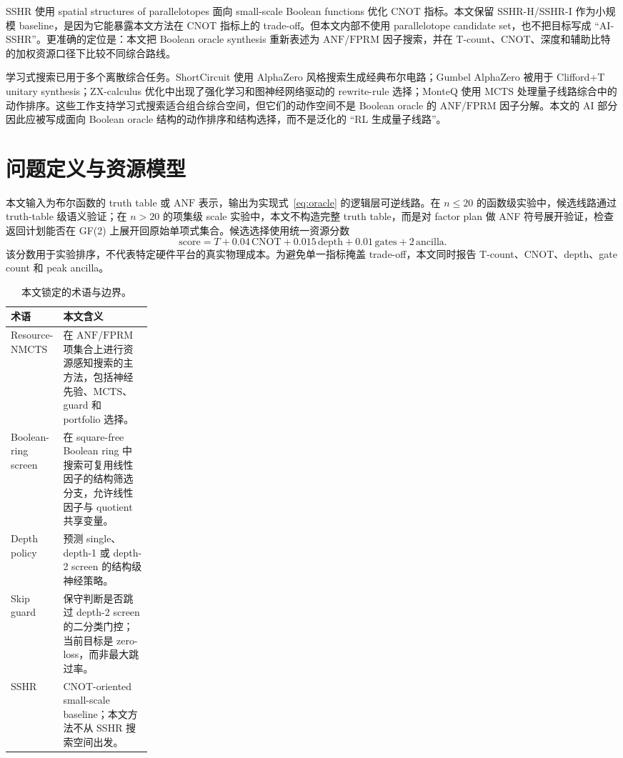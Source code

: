\documentclass[UTF8,fontset=macnew,11pt]{ctexart}
\newcommand{\method}{Resource-NMCTS}
\newcommand{\screen}{Boolean-ring screen}
\newcommand{\score}{\ensuremath{\mathrm{score}}}
\newcommand{\anf}{\ensuremath{\mathrm{ANF}}}
\newcommand{\fprm}{\ensuremath{\mathrm{FPRM}}}
\newcommand{\mcts}{\ensuremath{\mathrm{MCTS}}}
\begin{document}
SSHR 使用 spatial structures of parallelotopes 面向 small-scale Boolean functions 优化 CNOT 指标\cite{zheng2025sshr}。本文保留 SSHR-H/SSHR-I 作为小规模 baseline，是因为它能暴露本文方法在 CNOT 指标上的 trade-off。但本文内部不使用 parallelotope candidate set，也不把目标写成 ``AI-SSHR''。更准确的定位是：本文把 Boolean oracle synthesis 重新表述为 \anf{}/\fprm{} 因子搜索，并在 T-count、CNOT、深度和辅助比特的加权资源口径下比较不同综合路线。

学习式搜索已用于多个离散综合任务。ShortCircuit 使用 AlphaZero 风格搜索生成经典布尔电路\cite{tsaras2024shortcircuit}；Gumbel AlphaZero 被用于 Clifford+T unitary synthesis\cite{rietsch2024unitary}；ZX-calculus 优化中出现了强化学习和图神经网络驱动的 rewrite-rule 选择\cite{riu2025rlzx}；MonteQ 使用 \mcts{} 处理量子线路综合中的动作排序\cite{machiya2026monteq}。这些工作支持学习式搜索适合组合综合空间，但它们的动作空间不是 Boolean oracle 的 \anf{}/\fprm{} 因子分解。本文的 AI 部分因此应被写成面向 Boolean oracle 结构的动作排序和结构选择，而不是泛化的 ``RL 生成量子线路''。

\section{问题定义与资源模型}

本文输入为布尔函数的 truth table 或 \anf{} 表示，输出为实现式~\eqref{eq:oracle} 的逻辑层可逆线路。在 $n\leq20$ 的函数级实验中，候选线路通过 truth-table 级语义验证；在 $n>20$ 的项集级 scale 实验中，本文不构造完整 truth table，而是对 factor plan 做 ANF 符号展开验证，检查返回计划能否在 GF(2) 上展开回原始单项式集合。候选选择使用统一资源分数
\begin{equation}
  \score = T + 0.04\,\mathrm{CNOT} + 0.015\,\mathrm{depth}
         + 0.01\,\mathrm{gates} + 2\,\mathrm{ancilla}.
  \label{eq:score}
\end{equation}
该分数用于实验排序，不代表特定硬件平台的真实物理成本。为避免单一指标掩盖 trade-off，本文同时报告 T-count、CNOT、depth、gate count 和 peak ancilla。

\begin{table}[t]
\centering
\small
\caption{本文锁定的术语与边界。}
\label{tab:terms}
\begin{tabularx}{\linewidth}{>{\raggedright\arraybackslash}p{0.23\linewidth}>{\raggedright\arraybackslash}X}
\toprule
术语 & 本文含义 \\
\midrule
\method{} & 在 \anf{}/\fprm{} 项集合上进行资源感知搜索的主方法，包括神经先验、\mcts{}、guard 和 portfolio 选择。 \\
\screen{} & 在 square-free Boolean ring 中搜索可复用线性因子的结构筛选分支，允许线性因子与 quotient 共享变量。 \\
Depth policy & 预测 single、depth-1 或 depth-2 screen 的结构级神经策略。 \\
Skip guard & 保守判断是否跳过 depth-2 screen 的二分类门控；当前目标是 zero-loss，而非最大跳过率。 \\
SSHR & CNOT-oriented small-scale baseline；本文方法不从 SSHR 搜索空间出发。 \\
\bottomrule
\end{tabularx}
\end{table}
\end{document}
